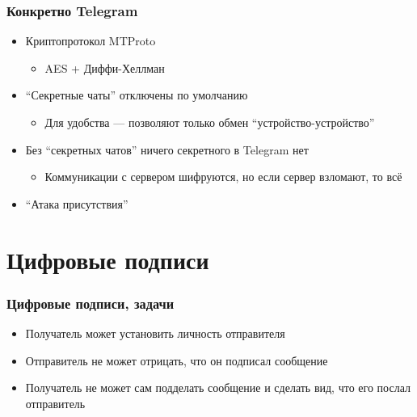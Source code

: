 \documentclass[xetex,mathserif,serif]{beamer}
\begin{document}
	\begin{frame}
		\frametitle{Конкретно Telegram}
		\begin{itemize}
			\item Криптопротокол MTProto
			\begin{itemize}
				\item AES + Диффи-Хеллман
			\end{itemize}
			\item ``Секретные чаты'' отключены по умолчанию
			\begin{itemize}
				\item Для удобства --- позволяют только обмен ``устройство-устройство''
			\end{itemize}
			\item Без ``секретных чатов'' ничего секретного в Telegram нет
			\begin{itemize}
				\item Коммуникации с сервером шифруются, но если сервер взломают, то всё
			\end{itemize}
			\item ``Атака присутствия''
		\end{itemize}
	\end{frame}

	\section{Цифровые подписи}

	\begin{frame}
		\frametitle{Цифровые подписи, задачи}
		\begin{itemize}
			\item Получатель может установить личность отправителя
			\item Отправитель не может отрицать, что он подписал сообщение
			\item Получатель не может сам подделать сообщение и сделать вид, что его послал отправитель
		\end{itemize}
	\end{frame}
\end{document}
